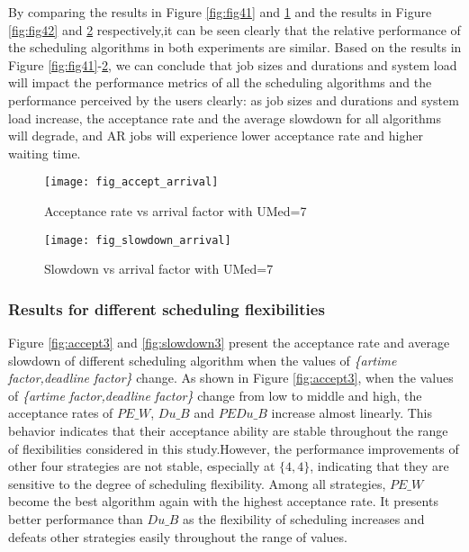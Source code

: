 \documentclass[preprint,12pt]{elsarticle}
\begin{document}
By comparing the results in Figure \ref{fig:fig41} and \ref{fig:accept2} and the results in Figure \ref{fig:fig42} and \ref{fig:slowdown2} respectively,it can be seen clearly that the relative performance of the scheduling algorithms in both experiments are similar. Based on the results in Figure \ref{fig:fig41}-\ref{fig:slowdown2}, we can conclude that job sizes and durations and system load will impact the performance metrics of all the scheduling algorithms and the performance perceived by the users clearly: as job sizes and durations and system load increase, the acceptance rate and the average slowdown for all algorithms will degrade, and AR jobs will experience lower acceptance rate and higher waiting time.

\begin{figure}[htp]
\centering
\texttt{[image: fig\_accept\_arrival]}
\caption{Acceptance rate vs arrival factor with UMed=7}
\label{fig:accept2}
\end{figure}


\begin{figure}[htp]
\centering
\texttt{[image: fig\_slowdown\_arrival]}
\caption{Slowdown vs arrival factor with UMed=7}
\label{fig:slowdown2}
\end{figure}


\subsubsection{Results for different scheduling flexibilities}

Figure \ref{fig:accept3} and \ref{fig:slowdown3} present the acceptance rate and  average slowdown of different scheduling algorithm when the values of \emph{\{artime factor,deadline factor\}} change.
As shown in Figure \ref{fig:accept3}, when the values of \emph{\{artime factor,deadline factor\}} change from low to middle and high, the acceptance rates of $PE\_W$, $Du\_B$ and $PEDu\_B$ increase almost linearly. This behavior indicates that their acceptance ability are stable throughout the range of flexibilities considered in this study.However, the performance improvements of other four strategies are not stable, especially at $\{4,4\}$, indicating that they are sensitive to the degree of scheduling flexibility.  Among all strategies, $PE\_W$ become the best algorithm again with the highest acceptance rate. It presents better performance than $Du\_B$ as the flexibility of scheduling increases and defeats other strategies easily throughout the range of values.
\end{document}

